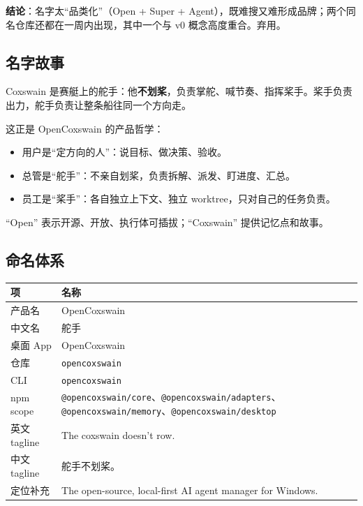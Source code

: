 \documentclass[UTF8,11pt,a4paper,fontset=windows]{ctexart}
\let\ocsubsection\subsection
\renewcommand{\subsection}{\Needspace{5\baselineskip}\ocsubsection}
\newcommand{\code}[1]{\texttt{#1}}
\begin{document}
\textbf{结论}：名字太“品类化”（Open + Super + Agent），既难搜又难形成品牌；两个同名仓库还都在一周内出现，其中一个与 v0 概念高度重合。弃用。

\subsection{名字故事}

Coxswain 是赛艇上的舵手：他\textbf{不划桨}，负责掌舵、喊节奏、指挥桨手。桨手负责出力，舵手负责让整条船往同一个方向走。

这正是 OpenCoxswain 的产品哲学：

\begin{itemize}
  \item 用户是“定方向的人”：说目标、做决策、验收。
  \item 总管是“舵手”：不亲自划桨，负责拆解、派发、盯进度、汇总。
  \item 员工是“桨手”：各自独立上下文、独立 worktree，只对自己的任务负责。
\end{itemize}

“Open” 表示开源、开放、执行体可插拔；“Coxswain” 提供记忆点和故事。

\newpage
\subsection{命名体系}

\noindent\begin{minipage}{\linewidth}
\centering
{}
\small
\begin{tabularx}{\linewidth}{@{}p{3.2cm} X@{}}
\toprule
\textbf{项} & \textbf{名称} \\
\midrule
产品名 & OpenCoxswain \\
中文名 & 舵手 \\
桌面 App & OpenCoxswain \\
仓库 & \code{opencoxswain} \\
CLI & \code{opencoxswain} \\
npm scope & \code{@opencoxswain/core}、\code{@opencoxswain/adapters}、\code{@opencoxswain/memory}、\code{@opencoxswain/desktop} \\
英文 tagline & The coxswain doesn't row. \\
中文 tagline & 舵手不划桨。 \\
定位补充 & The open-source, local-first AI agent manager for Windows. \\
\bottomrule
\end{tabularx}
\end{minipage}
\end{document}
